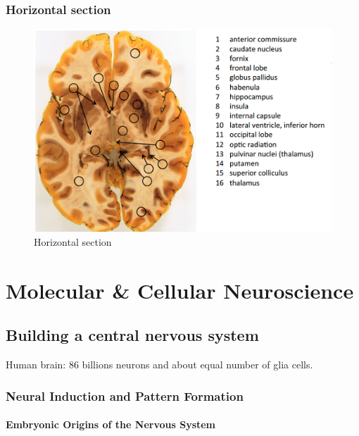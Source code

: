 \documentclass[12pt,article,oneside,a4paper]{memoir}
\begin{document}
\subsubsection{Horizontal section}
\begin{figure}[H]
	\centering
  	\includegraphics[width=\linewidth]{imgs/horizontal-section.png}
	\caption{Horizontal section}
  	\label{fig:horizontalSection}
\end{figure}

\section{Molecular \& Cellular Neuroscience}
\subsection{Building a central nervous system}
Human brain: 86 billions neurons and about equal number of glia cells.

\subsubsection{Neural Induction and Pattern Formation}

\paragraph{Embryonic Origins of the Nervous System}
\end{document}
